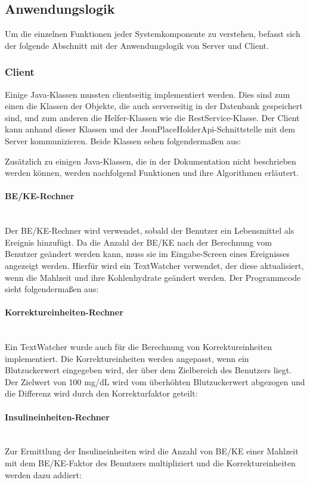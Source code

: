 	\subsection{Anwendungslogik}
	Um die einzelnen Funktionen jeder Systemkomponente zu verstehen, befasst sich der folgende Abschnitt mit der Anwendungslogik von Server und Client.
	\subsubsection{Client}
	Einige Java-Klassen mussten clientseitig implementiert werden. Dies sind zum einen die Klassen der Objekte, die auch serverseitig in der Datenbank gespeichert sind, und zum anderen die Helfer-Klassen wie die RestService-Klasse. Der Client kann anhand dieser Klassen und der JsonPlaceHolderApi-Schnittstelle mit dem Server kommunizieren. Beide Klassen sehen folgendermaßen aus:
	
	
	Zusätzlich zu einigen Java-Klassen, die in der Dokumentation nicht beschrieben werden können, werden nachfolgend Funktionen und ihre Algorithmen erläutert. 
	\paragraph{BE/KE-Rechner}$~$\\
	Der BE/KE-Rechner wird verwendet, sobald der Benutzer ein Lebensmittel als Ereignis hinzufügt. Da die Anzahl der BE/KE nach der Berechnung vom Benutzer geändert werden kann, muss sie im Eingabe-Screen eines Ereignisses angezeigt werden. Hierfür wird ein TextWatcher verwendet, der diese aktualisiert, wenn die Mahlzeit und ihre Kohlenhydrate geändert werden. Der Programmcode sieht folgendermaßen aus: 
	
	\paragraph{Korrektureinheiten-Rechner}$~$\\
	Ein TextWatcher wurde auch für die Berechnung von Korrektureinheiten implementiert. Die Korrektureinheiten werden angepasst, wenn ein Blutzuckerwert eingegeben wird, der über dem Zielbereich des Benutzers liegt. Der Zielwert von 100 mg/dL wird vom überhöhten Blutzuckerwert abgezogen und die Differenz wird durch den Korrekturfaktor geteilt:
	
	\paragraph{Insulineinheiten-Rechner}$~$\\
	Zur Ermittlung der Insulineinheiten wird die Anzahl von BE/KE einer Mahlzeit mit dem BE/KE-Faktor des Benutzers multipliziert und die Korrektureinheiten werden dazu addiert:
	

